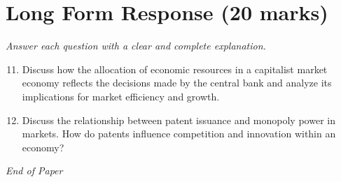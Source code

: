\documentclass[12pt]{article}
\begin{document}
\section*{Long Form Response (20 marks)}
\textit{Answer each question with a clear and complete explanation.}
\begin{enumerate}[label=\arabic*.]
\setcounter{enumi}{10}
\item Discuss how the allocation of economic resources in a capitalist market economy reflects the decisions made by the central bank and analyze its implications for market efficiency and growth.
\item Discuss the relationship between patent issuance and monopoly power in markets. How do patents influence competition and innovation within an economy?
\end{enumerate}

\vfill
\noindent\textit{End of Paper}
\end{document}
